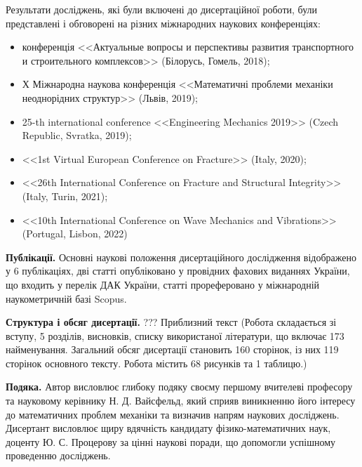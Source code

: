 Результати досліджень, які були включені до дисертаційної роботи, були представлені і обговорені на різних міжнародних наукових конференціях:
\begin{itemize}
    \item конференція  <<Актуальные вопросы и перспективы развития транспортного и строительного комплексов>> (Білорусь, Гомель, 2018);
    \item Х Міжнародна наукова конференція <<Математичні проблеми механіки неоднорідних структур>> (Львів, 2019);
    \item 25-th international conference <<Engineering Mechanics 2019>> (Czech Republic, Svratka, 2019);
    \item <<1st Virtual European Conference on Fracture>> (Italy, 2020);
    \item <<26th International Conference on Fracture and Structural Integrity>> (Italy, Turin, 2021);
    \item <<10th International Conference on Wave Mechanics and Vibrations>> (Portugal, Lisbon, 2022)
\end{itemize}

\textbf{Публікації.}
Основні наукові положення дисертаційного дослідження відображено у 6 публікаціях,
дві статті \cite{pozhylenkov_2,pozhylenkov_3} опубліковано у провідних фахових виданнях України, що входить у перелік ДАК України,
статті \cite{pozhylenkov_1,pozhylenkov_4,pozhylenkov_5,pozhylenkov_6} прореферовано у міжнародній наукометричній базі Scopus.

\textbf{Структура і обсяг дисертації.}
???
Приблизний текст (Робота складається зі вступу, 5 розділів, висновків, списку використаної літератури, що включає 173 найменування. Загальний обсяг дисертації становить 160 сторінок, із них 119 сторінок основного тексту. Робота містить 68 рисунків та 1 таблицю.)

\textbf{Подяка.}
Автор висловлює глибоку подяку своєму першому вчителеві професору та науковому керівнику Н. Д. Вайсфельд, який сприяв виникненню його інтересу до математичних проблем механіки та визначив напрям наукових досліджень.
Дисертант висловлює щиру вдячність кандидату фізико-математичних наук, доценту Ю. С. Процерову за цінні наукові поради, що допомогли успішному проведенню досліджень.